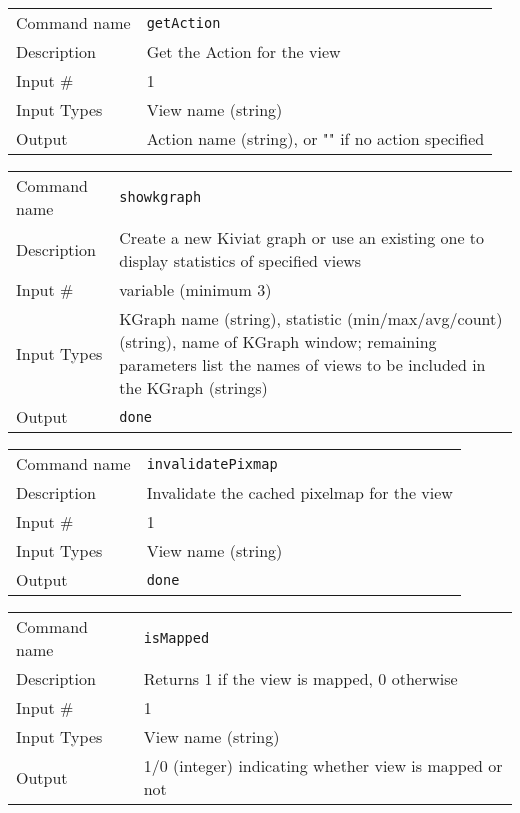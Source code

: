 \bigskip

\noindent
\begin{tabular}{l|p{5in}}
\hline
Command name & {\tt getAction} \\
Description  & Get the Action for the view \\
Input \#     & 1 \\
Input Types  & View name (string) \\
Output       & Action name (string), or "" if no action specified \\
\hline
\end{tabular}

\bigskip

\noindent
\begin{tabular}{l|p{5in}}
\hline
Command name & {\tt showkgraph} \\
Description  & Create a new Kiviat graph or use an existing one to display
               statistics of specified views \\
Input \#     & variable (minimum 3) \\
Input Types  & KGraph name (string), statistic (min/max/avg/count) (string),
               name of KGraph window; remaining parameters list the names of
               views to be included in the KGraph (strings) \\
Output       & {\tt done} \\
\hline
\end{tabular}

\bigskip

\noindent
\begin{tabular}{l|p{5in}}
\hline
Command name & {\tt invalidatePixmap} \\
Description  & Invalidate the cached pixelmap for the view \\
Input \#     & 1 \\
Input Types  & View name (string) \\
Output       & {\tt done} \\
\hline
\end{tabular}

\bigskip

\noindent
\begin{tabular}{l|p{5in}}
\hline
Command name & {\tt isMapped} \\
Description  & Returns 1 if the view is mapped, 0 otherwise \\
Input \#     & 1 \\
Input Types  & View name (string) \\
Output       & 1/0 (integer) indicating whether view is mapped or not \\
\hline
\end{tabular}


